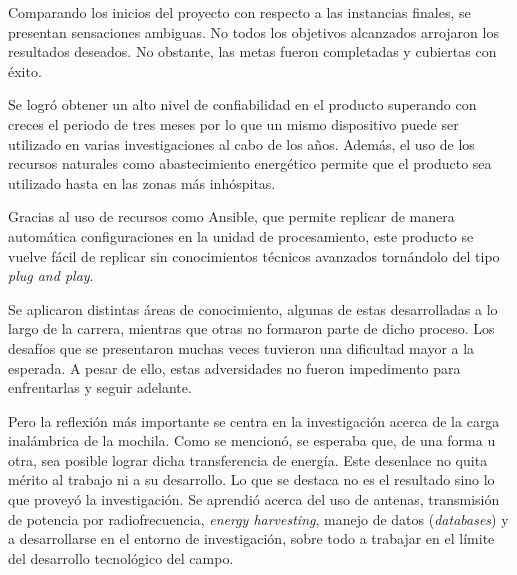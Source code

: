 
Comparando los inicios del proyecto con respecto a las instancias finales, se presentan sensaciones ambiguas. No todos los objetivos alcanzados arrojaron los resultados deseados. No obstante, las metas fueron completadas y cubiertas con éxito. 

Se logró obtener un alto nivel de confiabilidad en el producto superando con creces el periodo de tres meses por lo que un mismo dispositivo puede ser utilizado en varias investigaciones al cabo de los años. Además, el uso de los recursos naturales como abastecimiento energético permite que el producto sea utilizado hasta en las zonas más inhóspitas.

Gracias al uso de recursos como Ansible, que permite replicar de manera automática configuraciones en la unidad de procesamiento, este producto se vuelve fácil de replicar sin conocimientos técnicos avanzados tornándolo del tipo \textit{plug and play}. 

Se aplicaron distintas áreas de conocimiento, algunas de estas desarrolladas a lo largo de la carrera, mientras que otras no formaron parte de dicho proceso. Los desafíos que se presentaron muchas veces tuvieron una dificultad mayor a la esperada. A pesar de ello, estas adversidades no fueron impedimento para enfrentarlas y seguir adelante.

Pero la reflexión más importante se centra en la investigación acerca de la carga inalámbrica de la mochila. Como se mencionó, se esperaba que, de una forma u otra, sea posible lograr dicha transferencia de energía. Este desenlace no quita mérito al trabajo ni a su desarrollo. Lo que se destaca no es el resultado sino lo que proveyó la investigación. Se aprendió acerca del uso de antenas, transmisión de potencia por radiofrecuencia, \textit{energy harvesting}, manejo de datos (\textit{databases}) y a desarrollarse en el entorno de investigación, sobre todo a trabajar en el límite del desarrollo tecnológico del campo.
